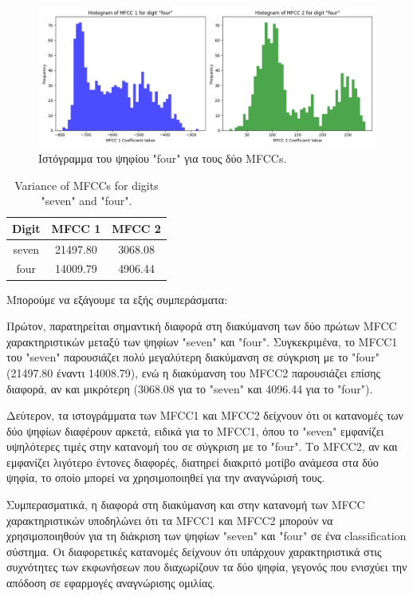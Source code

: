 \documentclass[a4paper,12pt]{article}
\begin{document}
\begin{figure}[H]
    \centering
    \includegraphics[width=\textwidth]{images/histograms_four.png}
    \caption{Ιστόγραμμα του ψηφίου "four" για τους δύο MFCCs.}
    \label{fig:hist2}
\end{figure}


\begin{table}
    \centering
    \begin{tabular}{|c|c|c|}
    \hline
    \textbf{Digit} & \textbf{MFCC 1} & \textbf{MFCC 2} \\ \hline
    seven & 21497.80 & 3068.08 \\ \hline
    four & 14009.79 & 4906.44 \\ \hline
    \end{tabular}
    \caption{Variance of MFCCs for digits "seven" and "four".}
    \label{tab:variance}
\end{table}

Mπορούμε να εξάγουμε τα εξής συμπεράσματα:

Πρώτον, παρατηρείται σημαντική διαφορά στη διακύμανση των δύο πρώτων MFCC χαρακτηριστικών μεταξύ των ψηφίων "seven" και "four". 
Συγκεκριμένα, το MFCC1 του "seven" παρουσιάζει πολύ μεγαλύτερη διακύμανση σε σύγκριση με το "four" (21497.80 έναντι 14008.79), 
ενώ η διακύμανση του MFCC2 παρουσιάζει επίσης διαφορά, αν και μικρότερη (3068.08 για το "seven" και 4096.44 για το "four").

Δεύτερον, τα ιστογράμματα των MFCC1 και MFCC2 δείχνουν ότι οι κατανομές των δύο ψηφίων διαφέρουν αρκετά, 
ειδικά για το MFCC1, όπου το "seven" εμφανίζει υψηλότερες τιμές στην κατανομή του σε σύγκριση με το "four". 
Το MFCC2, αν και εμφανίζει λιγότερο έντονες διαφορές, διατηρεί διακριτό μοτίβο ανάμεσα στα δύο ψηφία, 
το οποίο μπορεί να χρησιμοποιηθεί για την αναγνώρισή τους.

Συμπερασματικά, η διαφορά στη διακύμανση και στην κατανομή των MFCC χαρακτηριστικών υποδηλώνει ότι τα MFCC1 και 
MFCC2 μπορούν να χρησιμοποιηθούν για τη διάκριση των ψηφίων "seven" και "four" σε ένα classification σύστημα. 
Οι διαφορετικές κατανομές δείχνουν ότι υπάρχουν χαρακτηριστικά στις συχνότητες των εκφωνήσεων που 
διαχωρίζουν τα δύο ψηφία, γεγονός που ενισχύει την απόδοση σε εφαρμογές αναγνώρισης ομιλίας.
\end{document}
